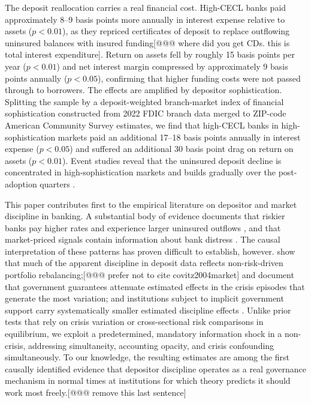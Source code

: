 The deposit reallocation carries a real financial cost.  High-CECL banks paid
approximately 8--9 basis points more annually in interest expense relative to
assets ($p < 0.01$), as they repriced certificates of deposit to replace outflowing
uninsured balances with insured funding[@@@ where did you get CDs. this is total interest expenditure].  Return on assets fell by roughly 15
basis points per year ($p < 0.01$) and net interest margin compressed by
approximately 9 basis points annually ($p < 0.05$), confirming that higher
funding costs were not passed through to borrowers.  The effects are amplified
by depositor sophistication.  Splitting the sample by a deposit-weighted
branch-market index of financial sophistication constructed from 2022 FDIC branch
data merged to ZIP-code American Community Survey estimates, we find that high-CECL
banks in high-sophistication markets paid an additional 17--18 basis points
annually in interest expense ($p < 0.05$) and suffered an additional 30 basis
point drag on return on assets ($p < 0.01$).  Event studies reveal that the
uninsured deposit decline is concentrated in high-sophistication markets and builds
gradually over the post-adoption quarters \citep{egan2017deposit, iyer2016tale}.

This paper contributes first to the empirical literature on depositor and market
discipline in banking.  A substantial body of evidence documents that riskier
banks pay higher rates and experience larger uninsured outflows
\citep{park1995market, martinez2001depositors, maechler2006dynamic, egan2017deposit},
and that market-priced signals contain information about bank distress
\citep{flannery1996evidence, nier2006market}.  The causal interpretation of these
patterns has proven difficult to establish, however.  \citet{covitz2004market}
show that much of the apparent discipline in deposit data reflects non-risk-driven
portfolio rebalancing;[@@@ prefer not to cite covitz2004market] \citet{bennett2015market} and \citet{berger2015depositors}
document that government guarantees attenuate estimated effects in the crisis
episodes that generate the most variation; and institutions subject to implicit
government support carry systematically smaller estimated discipline effects
\citep{jacewitz2018deposit}.  Unlike prior tests that rely on crisis variation or
cross-sectional risk comparisons in equilibrium, we exploit a predetermined,
mandatory information shock in a non-crisis, addressing
simultaneity, accounting opacity, and crisis confounding simultaneously.  To our
knowledge, the resulting estimates are among the first causally identified evidence
that depositor discipline operates as a real governance mechanism in normal times
at institutions for which theory predicts it should work most freely.[@@@ remove this last sentence]

